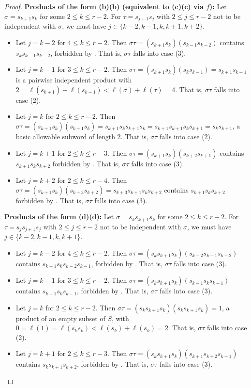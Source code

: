 \documentclass[10pt,a4paper]{amsart}
\begin{document}
\begin{proof}
\noindent \textbf{Products of the form (b)(b) (equivalent to (c)(c) via $f$):}
    Let $\sigma= s_{k+1}s_k$ for some $2\leq k\leq r-2$. For $\tau=s_{j+1}s_j$ with $2\leq j\leq r-2$ not to be independent with $\sigma$, we must have $j\in\{k-2,k-1,k,k+1,k+2\}$.
    \begin{itemize}
        \item Let $j=k-2$ for $4\leq k\leq r-2$. Then $\sigma\tau=(s_{k+1}s_k)(s_{k-1}s_{k-2})$ contains $s_ks_{k-1}s_{k-2}$, forbidden by . That is, $\sigma\tau$ falls into case (3).
        \item Let $j=k-1$ for $3\leq k\leq r-2$. Then $\sigma\tau=(s_{k+1}s_k)(s_ks_{k-1})=s_{k+1}s_{k-1}$ is a pairwise independent product with $2=\ell(s_{k+1})+\ell(s_{k-1})<\ell(\sigma)+\ell(\tau)=4$. That is, $\sigma\tau$ falls into case (2).
        \item Let $j=k$ for $2\leq k\leq r-2$. Then $\sigma\tau=(s_{k+1}s_k)(s_{k+1}s_k)=s_{k+1}s_ks_{k+1}s_k=s_{k+1}s_{k+1}s_ks_{k+1}=s_ks_{k+1}$, a basic allowable subword of length 2. That is, $\sigma\tau$ falls into case (2).
        \item Let $j=k+1$ for $2\leq k\leq r-3$. Then $\sigma\tau=(s_{k+1}s_k)(s_{k+2}s_{k+1})$ contains $s_{k+1}s_k s_{k+2}$ forbidden by . That is, $\sigma\tau$ falls into case (3).
        \item Let $j=k+2$ for $2\leq k\leq r-4$. Then $\sigma\tau=(s_{k+1}s_k)(s_{k+3}s_{k+2})=s_{k+3}s_{k+1}s_ks_{k+2}$ contains $s_{k+1}s_k s_{k+2}$ forbidden by . That is, $\sigma\tau$ falls into case (3).
    \end{itemize}
\smallskip

\noindent \textbf{Products of the form (d)(d):}
    Let $\sigma = s_ks_{k+1}s_k$ for some $2 \le k \le r-2$. For $\tau= s_js_{j+1}s_j$ with $2 \le j \le r-2$ not to be independent with $\sigma$, we must have $j\in\{k-2,k-1,k,k+1\}$.
    \begin{itemize}
        \item Let $j=k-2$ for $4\leq k\leq r-2$. Then $\sigma\tau=(s_ks_{k+1}s_k)(s_{k-2}s_{k-1}s_{k-2})$ contains $s_{k+1}s_ks_{k-2}s_{k-1}$, forbidden by . That is, $\sigma\tau$ falls into case (3).
        \item Let $j=k-1$ for $3\leq k\leq r-2$. Then $\sigma\tau=(s_ks_{k+1}s_k)(s_{k-1}s_ks_{k-1})$ contains $s_{k+1}s_ks_{k-1}$, forbidden by . That is, $\sigma\tau$ falls into case (3).
        \item Let $j=k$ for $2\leq k\leq r-2$. Then $\sigma\tau=(s_ks_{k+1}s_k)(s_ks_{k+1}s_k)=1$, a product of an empty subset of $S$, with $0=\ell(1)=\ell(s_ks_{k})<\ell(s_k)+\ell(s_{k})=2$. That is, $\sigma\tau$ falls into case (2).
        \item Let $j=k+1$ for $2\leq k\leq r-3$. Then  $\sigma\tau=(s_ks_{k+1}s_k)(s_{k+1}s_{k+2}s_{k+1})$ contains $s_ks_{k+1}s_{k+2}$, forbidden by . That is, $\sigma\tau$ falls into case (3).
    \end{itemize}
    \smallskip
    

\end{proof}
\end{document}
